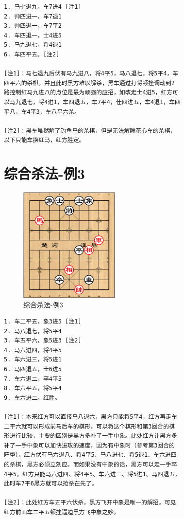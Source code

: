 \documentclass[a5paper,twoside]{book}
\begin{document}
\begin{verbatim}
1. 马七退九，车7进4 [注1]
2. 帅四进一，车7退1
3. 帅四退一，车7平2
4. 车四退一，士4进5
5. 马九退七，将4退1 
6. 车四平五。[注2]

[注1]：马七退九后伏有马九进八，将4平5，马八退七，将5平4，车
四平六的杀棋。并且此时黑方难以解杀，黑车通过打将顿挫调动到2
路控制红马九进八的点位是最为顽强的应招，如改走士4进5，红方可
以马九退七，将4进1，车四退五，车7平4，仕四进五，车4退1，车四
平八，车4平3，车八平六杀。

[注2]：黑车虽然解了钓鱼马的杀棋，但是无法解除花心车的杀棋，
以下只能车换红马，红方胜定。
\end{verbatim}

\section{综合杀法-例3}
\label{sec-7-3}
\begin{figure}[H]
\centering
\includegraphics[width=5cm]{pic/综合杀法-例3.png}
\caption{综合杀法-例3}
\end{figure}

\begin{verbatim}
1. 车二平五，象3进5 [注1]
2. 马八退七，将5平4
3. 车五平六，象5进3 [注2]
4. 马六进四，将4平5
5. 车六进三，将5进1
6. 马四退五，士6进5
7. 车六退二，卒4平5
8. 车六平五，将5平4
9. 车六进二。红胜。

[注1]：本来红方可以直接马八退六，黑方只能将5平4，红方再走车
二平六就可以形成前马后车的棋形。可以将这个棋形和第3回合的棋
形进行比较，主要的区别是黑方多补了一手中象。此处红方让黑方多
补了一手中象可以加快进攻的速度，因为有中象时（参考第3回合的
阵型），红方伏有马六退八、将4平5、马八进七、将5退1、车六进四
的杀棋，黑方必须立刻应。而如果没有中象的话，黑方可以走一手卒
4平5，红方只能马六进四、将4平5、车六进三、将5进1、马四退五，
此时车7平6黑方就可以抢杀在先了。

[注2]：此处红方车五平六伏杀，黑方飞开中象是唯一的解招。可见
红方前面车二平五顿挫逼迫黑方飞中象之妙。
\end{verbatim}
\end{document}
